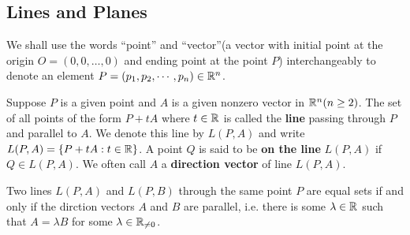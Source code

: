 \documentclass[a4paper]{ctexart}
\begin{document}
    \subsection{Lines and Planes}
    \begin{myrmk}
        We shall use the words ``point'' and ``vector''(a vector with initial point at the origin $O=(0,0,\ldots,0)$ and ending point at the point $P$) interchangeably to denote an element $P = (p_1, p_2, \cdots, p_n) \in \mathbb{R}^n$.
    \end{myrmk}
    \begin{mydef}
        Suppose $P$ is a given point and $A$ is a given nonzero vector in $\mathbb{R}^n(n\ge 2)$. The set of all points of the form $P+tA$ where $t\in \mathbb{R}$ is called the \textbf{line} passing through $P$ and parallel to $A$. We denote this line by $L(P,A)$ and write $L(P,A) = \{ P+tA : t\in \mathbb{R}\}$. A point $Q$ is said to be \textbf{on the line} $L(P,A)$ if $Q\in L(P,A)$. We often call $A$ a \textbf{direction vector} of line $L(P,A)$.
    \end{mydef}
    \begin{mythm}
        Two lines $L(P,A)$ and $L(P,B)$ through the same point $P$ are equal sets if and only if the dirction vectors $A$ and $B$ are parallel, i.e. there is some $\lambda \in \mathbb{R}$ such that $A = \lambda B$ for some $\lambda \in \mathbb{R}_{\neq 0}$.
    \end{mythm}
\end{document}
